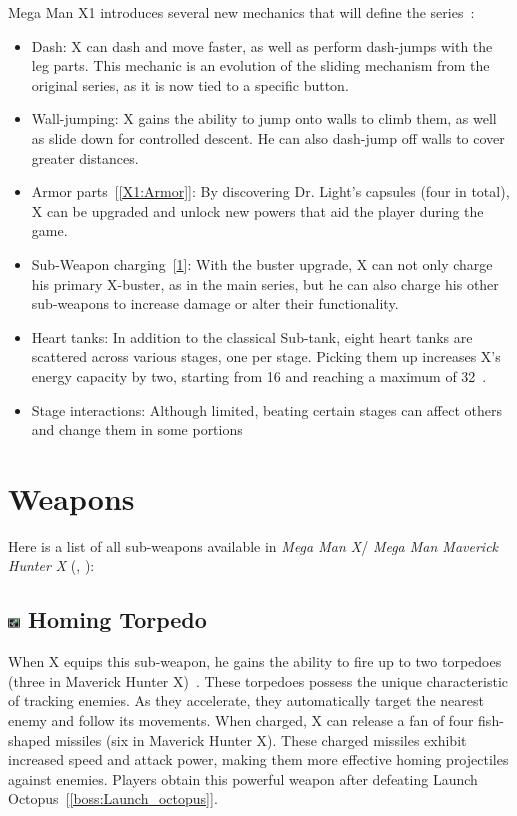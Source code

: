 Mega Man X1 introduces several new mechanics that will define the series~\cite{wiki:X1_features}:
\begin{itemize}
	
\item Dash: X can dash and move faster, as well as perform dash-jumps with the leg parts. This mechanic is an evolution of the sliding mechanism from the original series, as it is now tied to a specific button.

\item Wall-jumping: X gains the ability to jump onto walls to climb them, as well as slide down for controlled descent. He can also dash-jump off walls to cover greater distances.

\item Armor parts~[\ref{X1:Armor}]: By discovering Dr. Light's capsules (four in total), X can be upgraded and unlock new powers that aid the player during the game.

\item Sub-Weapon charging~[\ref{X1:sub_weapon}]: With the buster upgrade, X can not only charge his primary X-buster, as in the main series, but he can also charge his other sub-weapons to increase damage or alter their functionality.

\item Heart tanks: In addition to the classical Sub-tank, eight heart tanks are scattered across various stages, one per stage. Picking them up increases X's energy capacity by two, starting from 16 and reaching a maximum of 32~\cite{stratwiki:Heart_tank}.

\item Stage interactions: Although limited, beating certain stages can affect others and change them in some portions
\end{itemize}

\section{Weapons}\label{X1:sub_weapon}
Here is a list of all sub-weapons available in\textit{ Mega Man X}/ \textit{Mega Man Maverick Hunter X} (\cite{MHX:manual}, \cite{wiki:X_weapons}):

\subsection{\includegraphics[width=12px, height=10px]{figures/X1/weapons/Homig_T.jpg} Homing Torpedo}\label{Homing_torpedo}
When X equips this sub-weapon, he gains the ability to fire up to two torpedoes (three in Maverick Hunter X)~\cite{wiki:Homing_torpedo}. These torpedoes possess the unique characteristic of tracking enemies. As they accelerate, they automatically target the nearest enemy and follow its movements. When charged, X can release a fan of four fish-shaped missiles (six in Maverick Hunter X). These charged missiles exhibit increased speed and attack power, making them more effective homing projectiles against enemies. Players obtain this powerful weapon after defeating Launch Octopus~[\ref{boss:Launch_octopus}].


